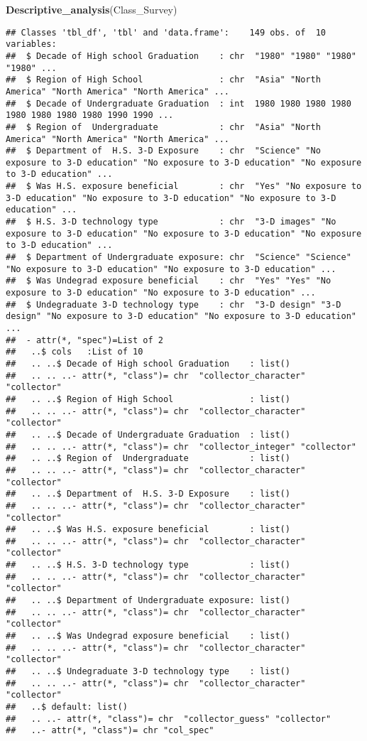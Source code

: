 \documentclass[]{article}
\newenvironment{Shaded}{\begin{snugshade}}{\end{snugshade}}
\newcommand{\KeywordTok}[1]{\textcolor[rgb]{0.13,0.29,0.53}{\textbf{#1}}}
\newcommand{\NormalTok}[1]{#1}
\begin{document}
\begin{Shaded}
\begin{Highlighting}[]
\KeywordTok{Descriptive_analysis}\NormalTok{(Class_Survey)}
\end{Highlighting}
\end{Shaded}

\begin{verbatim}
## Classes 'tbl_df', 'tbl' and 'data.frame':    149 obs. of  10 variables:
##  $ Decade of High school Graduation    : chr  "1980" "1980" "1980" "1980" ...
##  $ Region of High School               : chr  "Asia" "North America" "North America" "North America" ...
##  $ Decade of Undergraduate Graduation  : int  1980 1980 1980 1980 1980 1980 1980 1980 1990 1990 ...
##  $ Region of  Undergraduate            : chr  "Asia" "North America" "North America" "North America" ...
##  $ Department of  H.S. 3-D Exposure    : chr  "Science" "No exposure to 3-D education" "No exposure to 3-D education" "No exposure to 3-D education" ...
##  $ Was H.S. exposure beneficial        : chr  "Yes" "No exposure to 3-D education" "No exposure to 3-D education" "No exposure to 3-D education" ...
##  $ H.S. 3-D technology type            : chr  "3-D images" "No exposure to 3-D education" "No exposure to 3-D education" "No exposure to 3-D education" ...
##  $ Department of Undergraduate exposure: chr  "Science" "Science" "No exposure to 3-D education" "No exposure to 3-D education" ...
##  $ Was Undegrad exposure beneficial    : chr  "Yes" "Yes" "No exposure to 3-D education" "No exposure to 3-D education" ...
##  $ Undegraduate 3-D technology type    : chr  "3-D design" "3-D design" "No exposure to 3-D education" "No exposure to 3-D education" ...
##  - attr(*, "spec")=List of 2
##   ..$ cols   :List of 10
##   .. ..$ Decade of High school Graduation    : list()
##   .. .. ..- attr(*, "class")= chr  "collector_character" "collector"
##   .. ..$ Region of High School               : list()
##   .. .. ..- attr(*, "class")= chr  "collector_character" "collector"
##   .. ..$ Decade of Undergraduate Graduation  : list()
##   .. .. ..- attr(*, "class")= chr  "collector_integer" "collector"
##   .. ..$ Region of  Undergraduate            : list()
##   .. .. ..- attr(*, "class")= chr  "collector_character" "collector"
##   .. ..$ Department of  H.S. 3-D Exposure    : list()
##   .. .. ..- attr(*, "class")= chr  "collector_character" "collector"
##   .. ..$ Was H.S. exposure beneficial        : list()
##   .. .. ..- attr(*, "class")= chr  "collector_character" "collector"
##   .. ..$ H.S. 3-D technology type            : list()
##   .. .. ..- attr(*, "class")= chr  "collector_character" "collector"
##   .. ..$ Department of Undergraduate exposure: list()
##   .. .. ..- attr(*, "class")= chr  "collector_character" "collector"
##   .. ..$ Was Undegrad exposure beneficial    : list()
##   .. .. ..- attr(*, "class")= chr  "collector_character" "collector"
##   .. ..$ Undegraduate 3-D technology type    : list()
##   .. .. ..- attr(*, "class")= chr  "collector_character" "collector"
##   ..$ default: list()
##   .. ..- attr(*, "class")= chr  "collector_guess" "collector"
##   ..- attr(*, "class")= chr "col_spec"
\end{verbatim}
\end{document}
